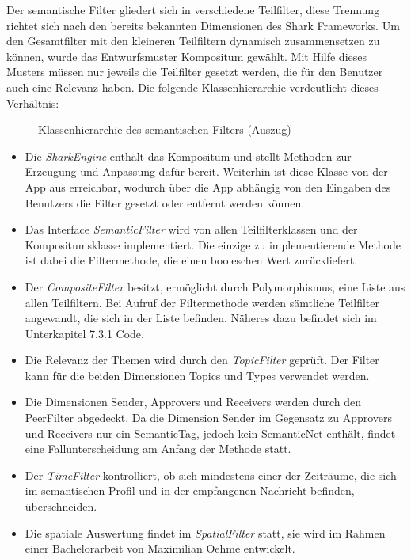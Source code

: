 \label{ch:filtercomps}
Der semantische Filter gliedert sich in verschiedene Teilfilter, diese Trennung richtet sich nach den bereits bekannten Dimensionen des Shark Frameworks. Um den Gesamtfilter mit den kleineren Teilfiltern dynamisch zusammensetzen zu können, wurde das Entwurfsmuster Kompositum gewählt. Mit Hilfe dieses Musters müssen nur jeweils die Teilfilter gesetzt werden, die für den Benutzer auch eine Relevanz haben. Die folgende Klassenhierarchie verdeutlicht dieses Verhältnis:
\begin{figure}[H]
	\centering
	\hspace*{1cm}
	\caption{Klassenhierarchie des semantischen Filters (Auszug)}
	\label{fig:broadcastStructure2}
\end{figure} 
\begin{itemize}
	\item Die \textit{SharkEngine} enthält das Kompositum und stellt Methoden zur Erzeugung und Anpassung dafür bereit. Weiterhin ist diese Klasse von der App aus erreichbar, wodurch über die App abhängig von den Eingaben des Benutzers die Filter gesetzt oder entfernt werden können.
	\item Das Interface \textit{SemanticFilter} wird von allen Teilfilterklassen und der Kompositumsklasse implementiert. Die einzige zu implementierende Methode ist dabei die Filtermethode, die einen booleschen Wert zurückliefert.
	\item Der \textit{CompositeFilter} besitzt, ermöglicht durch Polymorphismus, eine Liste aus allen Teilfiltern. Bei Aufruf der Filtermethode werden sämtliche Teilfilter angewandt, die sich in der Liste befinden. Näheres dazu befindet sich im Unterkapitel 7.3.1 Code. 
	\item Die Relevanz der Themen wird durch den \textit{TopicFilter} geprüft. Der Filter kann für die beiden Dimensionen Topics und Types verwendet werden.
	\item Die Dimensionen Sender, Approvers und Receivers werden durch den PeerFilter abgedeckt. Da die Dimension Sender im Gegensatz zu Approvers und Receivers nur ein SemanticTag, jedoch kein SemanticNet enthält, findet eine Fallunterscheidung am Anfang der Methode statt.
	\item Der \textit{TimeFilter} kontrolliert, ob sich mindestens einer der Zeiträume, die sich im semantischen Profil und in der empfangenen Nachricht befinden, überschneiden. 
	\item Die spatiale Auswertung findet im \textit{SpatialFilter} statt, sie wird im Rahmen einer Bachelorarbeit von Maximilian Oehme entwickelt.
\end{itemize}

